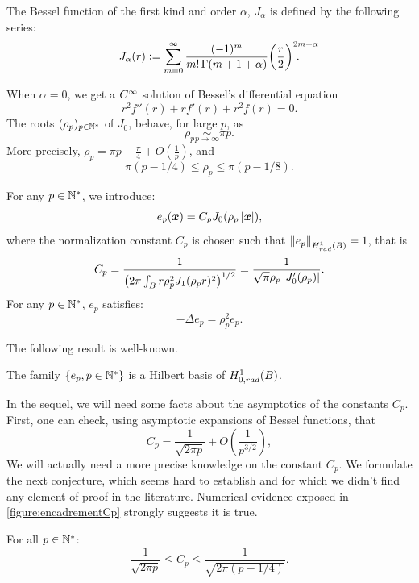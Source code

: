 \documentclass[smallextended]{svjour3}
\begin{document}
\begin{definition}
	\label{defJ0}
	The Bessel function of the first kind and order $\alpha$, $J_\alpha$ is defined by the following series: 
	\begin{equation}
		\label{J0powerSeries}
		J_\alpha(r) \isdef \sum_{m=0}^\infty \frac{(-1)^m}{m! \, \Gamma(m+1+\alpha)} {\bigg(\frac{r}{2}\bigg)}^{2m+\alpha}\!\!\!\!\!\!\!\!\!\!\!\!.
	\end{equation}
\end{definition}
\noindent When $\alpha=0$, we get a $C^{\infty}$ solution of Bessel's differential equation 
\begin{equation}
	\label{BesselDifferentialEquation}
	r^2f''(r) + r f'(r) + r^2 f(r) = 0.
\end{equation}
The roots $(\rho_p)_{p \in \mathbb{N}^*}$ of $J_0$, behave, for large $p$, as 
\[ \rho_p \underset{p \to \infty}{\sim} \pi p.\]
More precisely, $\rho_p = \pi p - \frac{\pi}{4} + O\left(\frac{1}{p}\right)$, and
\begin{equation}
	\pi(p - 1/4)\leq \rho_p \leq \pi(p - 1/8).
	\label{EncadrementRhop}
\end{equation}

\noindent For any $p\in \mathbb{N}^*$, we introduce:
\[e_p(\boldsymbol{x}) = C_p J_0(\rho_p \left\lvert \boldsymbol{x} \right\rvert),\]
where the normalization constant $C_p$ is chosen such that $\left\|e_p\right\|_{H^1_{rad}(B)} = 1$, that is  
\[C_p = \dfrac{1}{\left(2\pi \int_B  r \rho_p^2 J_1 (\rho_p r)^2\right)^{1/2}} = \dfrac{1}{\sqrt{\pi}\rho_p\left\lvert J_0'(\rho_p) \right\rvert}.\]
\noindent For any $p \in \mathbb{N}^*$, $e_p$ satisfies:
\begin{equation}
	\label{epEstUnVP}
	-\Delta e_p = \rho_p^2 e_p.
\end{equation}

The following result is well-known.
\begin{theorem} 
	\label{epEstUneBaseDeHilbert}
	The family $\left\{e_p, p\in \mathbb{N}^*\right\}$ is a Hilbert basis of $H^1_{0,rad}(B)$.
\end{theorem}

In the sequel, we will need some facts about the asymptotics of the constants $C_p$. First, one can check, using asymptotic expansions of Bessel functions, that
\begin{equation}
	\label{equivalentCp}
	C_p = \dfrac{1}{\sqrt{2 \pi p}} + O\left(\frac{1}{p^{3/2}}\right), 
\end{equation}
We will actually need a more precise knowledge on the constant $C_p$. We formulate the next conjecture, which seems hard to establish and for which we didn't find any element of proof in the literature. Numerical evidence exposed in \autoref{figure:encadrementCp} strongly suggests it is true. 
\begin{conjecture} 
	\label{ConjCp}
	For all $p \in \mathbb{N}^*$:
	\begin{equation}
		\label{EncadrementCp}
		\frac{1}{\sqrt{2\pi p}} \leq C_p \leq \frac{1}{\sqrt{2\pi (p-1/4)}}.
	\end{equation}
\end{conjecture}
\end{document}
